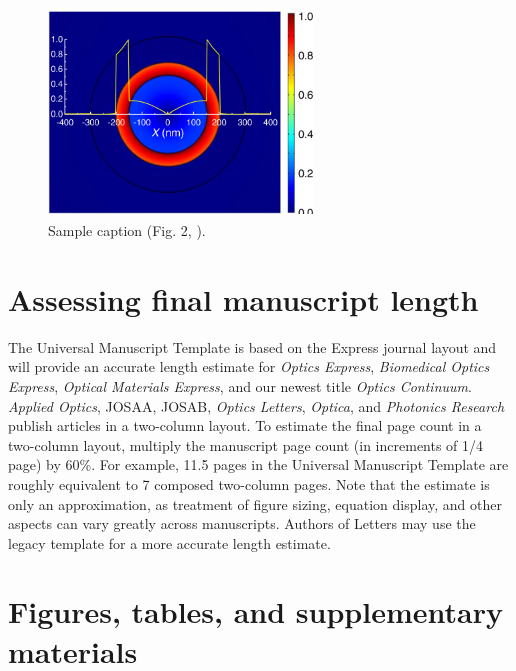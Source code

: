 \documentclass{../packages/optica-article}
\begin{document}
\begin{figure}[h!]
	\centering\includegraphics[width=7cm]{opticafig1}
	\caption{Sample caption (Fig. 2, \cite{Yelin:03}).}
\end{figure}


\section{Assessing final manuscript length}
The Universal Manuscript Template is based on the Express journal layout and will provide an accurate length estimate for \emph{Optics Express}, \emph{Biomedical Optics Express},  \emph{Optical Materials Express}, and our newest title \emph{Optics Continuum}. \emph{Applied Optics}, JOSAA, JOSAB, \emph{Optics Letters}, \emph{Optica}, and \emph{Photonics Research} publish articles in a two-column layout. To estimate the final page count in a two-column layout, multiply the manuscript page count (in increments of 1/4 page) by 60\%. For example, 11.5 pages in the Universal Manuscript Template are roughly equivalent to 7 composed two-column pages. Note that the estimate is only an approximation, as treatment of figure sizing, equation display, and other aspects can vary greatly across manuscripts. Authors of Letters may use the legacy template for a more accurate length estimate.

\section{Figures, tables, and supplementary materials}
\end{document}
